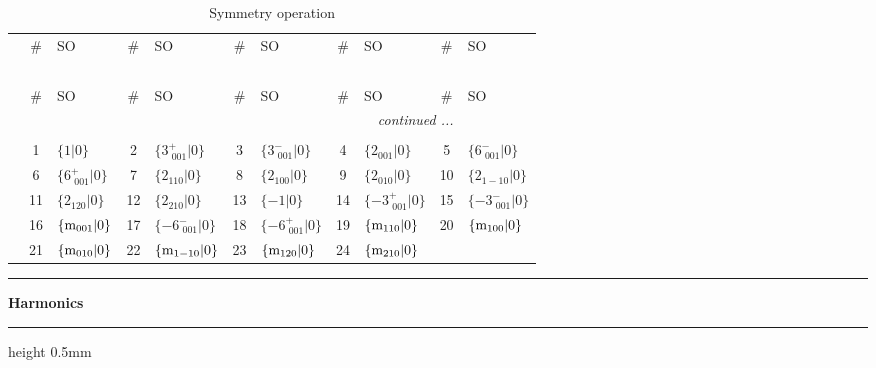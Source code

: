 \documentclass[fleqn,10pt,landscape]{jsarticle}
\begin{document}
\renewcommand{\arraystretch}{1.6}
\begin{longtable}[l]{c|cl|cl|cl|cl|cl}
\captionsetup{justification=raggedright, singlelinecheck=off}
\caption{Symmetry operation}
 \\
 \hline \hline
 & \# & SO & \# & SO & \# & SO & \# & SO & \# & SO \\ \hline \endfirsthead

\multicolumn{10}{l}{\tablename\ \thetable{}} \\
 \hline \hline
 & \# & SO & \# & SO & \# & SO & \# & SO & \# & SO \\ \hline \endhead

 \hline \hline
\multicolumn{10}{r}{\footnotesize\it continued ...} \\ \endfoot

 \hline \hline
\multicolumn{10}{r}{} \\ \endlastfoot

 & 1 & $\{1|0\}$ & 2 & $\{3^{+}_{\,\,001}|0\}$ & 3 & $\{3^{-}_{\,\,001}|0\}$ & 4 & $\{2{}_{001}|0\}$ & 5 & $\{6^{-}_{\,\,001}|0\}$ \\
& 6 & $\{6^{+}_{\,\,001}|0\}$ & 7 & $\{2{}_{110}|0\}$ & 8 & $\{2{}_{100}|0\}$ & 9 & $\{2{}_{010}|0\}$ & 10 & $\{2{}_{1-10}|0\}$ \\
& 11 & $\{2{}_{120}|0\}$ & 12 & $\{2{}_{210}|0\}$ & 13 & $\{-1|0\}$ & 14 & $\{-3^{+}_{\,\,001}|0\}$ & 15 & $\{-3^{-}_{\,\,001}|0\}$ \\
& 16 & $\{{\rm m}_{001}|0\}$ & 17 & $\{-6^{-}_{\,\,001}|0\}$ & 18 & $\{-6^{+}_{\,\,001}|0\}$ & 19 & $\{{\rm m}_{110}|0\}$ & 20 & $\{{\rm m}_{100}|0\}$ \\
& 21 & $\{{\rm m}_{010}|0\}$ & 22 & $\{{\rm m}_{1-10}|0\}$ & 23 & $\{{\rm m}_{120}|0\}$ & 24 & $\{{\rm m}_{210}|0\}$ &  &  \\
\end{longtable}
\vspace{5mm}
\noindent \rule[0.5mm]{5mm}{0.5mm}\hspace{3mm}\textbf{Harmonics}\hspace{3mm}\leaders\hrule height 0.5mm\hfill\kern0pt
\vspace{3mm}
\end{document}

